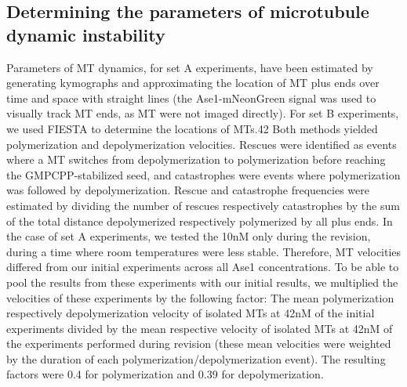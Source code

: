 \subsection{Determining the parameters of microtubule dynamic instability}
Parameters of MT dynamics, for set A experiments, have been estimated by generating kymographs and approximating the location of MT plus ends over time and space with straight lines (the Ase1-mNeonGreen signal was used to visually track MT ends, as MT were not imaged directly). For set B experiments, we used FIESTA to determine the locations of MTs.42 Both methods yielded polymerization and depolymerization velocities. Rescues were identified as events where a MT switches from depolymerization to polymerization before reaching the GMPCPP-stabilized seed, and catastrophes were events where polymerization was followed by depolymerization. Rescue and catastrophe frequencies were estimated by dividing the number of rescues respectively catastrophes by the sum of the total distance depolymerized respectively polymerized by all plus ends. In the case of set A experiments, we tested the 10nM only during the revision, during a time where room temperatures were less stable. Therefore, MT velocities differed from our initial experiments across all Ase1 concentrations. To be able to pool the results from these experiments with our initial results, we multiplied the velocities of these experiments by the following factor: The mean polymerization respectively depolymerization velocity of isolated MTs at 42nM of the initial experiments divided by the mean respective velocity of isolated MTs at 42nM of the experiments performed during revision (these mean velocities were weighted by the duration of each polymerization/depolymerization event). The resulting factors were 0.4 for polymerization and 0.39 for depolymerization.

